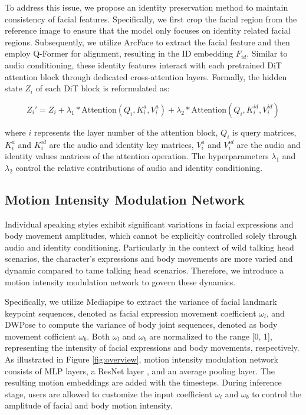\documentclass[sigconf]{acmart}
\begin{document}
To address this issue, we propose an identity preservation method to maintain consistency of facial features. Specifically, we first crop the facial region from the reference image \cite{deng2019accurate} to ensure that the model only focuses on identity related facial regions. Subsequently, we utilize ArcFace \cite{deng2019arcface} to extract the facial feature and then employ Q-Former \cite{li2023blip} for alignment, resulting in the ID embedding $F_{id}$. Similar to audio conditioning, these identity features interact with each pretrained DiT attention block through dedicated cross-attention layers. Formally, the hidden state $Z_i$ of each DiT block is reformulated as:

\begin{equation}
    Z_i' = Z_i + \lambda_1 * \text{Attention}(Q_i, K_i^a, V_i^a) + \lambda_2 * \text{Attention}(Q_i, K_i^{id}, V_i^{id})
\end{equation}

where $i$ represents the layer number of the attention block, $Q_i$ is query matrices, $K_i^a$ and $K_i^{id}$ are the audio and identity key matrices, $V_i^a$ and $V_i^{id}$ are the audio and identity values matrices of the attention operation. The hyperparameters $\lambda_1$ and $\lambda_2$ control the relative contributions of audio and identity conditioning.

\subsection{Motion Intensity Modulation Network} \label{subsec:motion}

Individual speaking styles exhibit significant variations in facial expressions and body movement amplitudes, which cannot be explicitly controlled solely through audio and identity conditioning. Particularly in the context of wild talking head scenarios, the character's expressions and body movements are more varied and dynamic compared to tame talking head scenarios. Therefore, we introduce a motion intensity modulation network to govern these dynamics.

Specifically, we utilize Mediapipe \cite{lugaresi2019mediapipe} to extract the variance of facial landmark keypoint sequences, denoted as facial expression movement coefficient $\omega_l$, and DWPose \cite{yang2023effective} to compute the variance of body joint sequences, denoted as body movement cofficient $\omega_b$. Both $\omega_l$ and $\omega_b$ are normalized to the range [0, 1], representing the intensity of facial expressions and body movements, respectively. As illustrated in Figure \ref{fig:overview}, motion intensity modulation network consists of MLP layers, a ResNet layer \cite{he2016deep}, and an average pooling layer. The resulting motion embeddings are added with the timesteps. During inference stage, users are allowed to customize the input coefficient $\omega_l$ and $\omega_b$ to control the amplitude of facial and body motion intensity.
\end{document}
